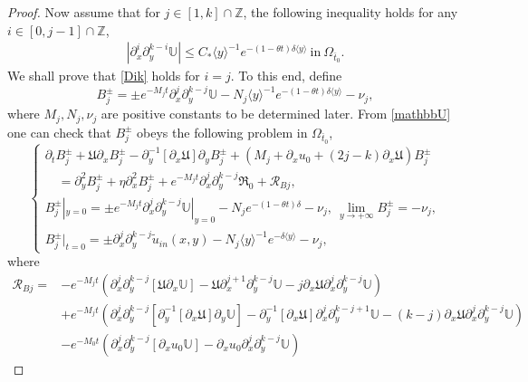 \documentclass{amsart}
\numberwithin{equation}{section}
\newcommand\y{{{\langle y \rangle}}}
\begin{document}
\begin{proof}
Now assume that for $j\in[1,k]\cap\mathbb{Z}$, the following inequality holds for any $i\in[0,j-1]\cap\mathbb{Z}$,
\begin{align}\label{Dik}
|\partial_{x}^{i}\partial_{y}^{k-i}\mathbb{U}|\leq C_{*}\y^{-1}e^{-(1-\theta t)\delta\y}~\text{in}~\Omega_{\bar{t}_{0}}.
\end{align}
We shall prove that \eqref{Dik} holds for $i=j$.
To this end, define
$$B_{j}^{\pm}=\pm e^{-M_{j}t}\partial_{x}^{j}\partial_{y}^{k-j}\mathbb{U}-N_{j}\y^{-1}e^{-(1-\theta t)\delta\y}-\nu_{j},$$
where $M_{j},N_{j},\nu_{j}$ are positive constants to be determined later.
From \eqref{mathbbU} one can check that $B_{j}^{\pm}$ obeys the following problem in $\Omega_{\bar{t}_{0}}$,
\begin{equation}\label{Bj}
\begin{cases}
\partial_{t}B_{j}^{\pm}
+\mathfrak{U}\partial_{x}B_{j}^{\pm}
-\partial_{y}^{-1}[\partial_{x}\mathfrak{U}]\partial_{y}B_{j}^{\pm}
+(M_{j}+\partial_{x}u_{0}+(2j-k)\partial_{x}\mathfrak{U})B_{j}^{\pm}\\
\quad=\partial_{y}^{2}B_{j}^{\pm}+\eta\partial_{x}^{2}B_{j}^{\pm}+e^{-M_{j}t}\partial_{x}^{j}\partial_{y}^{k-j}\mathfrak{R}_{0}+\mathcal{R}_{Bj},\\
B_{j}^{\pm}|_{y=0}=\pm e^{-M_{j}t}\partial_{x}^{j}\partial_{y}^{k-j}\mathbb{U}|_{y=0}-N_{j}e^{-(1-\theta t)\delta}-\nu_{j},
~\lim\limits_{y\to+\infty}B_{j}^{\pm}=-\nu_{j},\\
B_{j}^{\pm}|_{t=0}=\pm\partial_{x}^{j}\partial_{y}^{k-j}\tilde{u}_{in}(x,y)-N_{j}\y^{-1}e^{-\delta\y}-\nu_{j},
\end{cases}
\end{equation}
where
\begin{align*}
\mathcal{R}_{Bj}
=&-e^{-M_{j}t}\left(\partial_{x}^{j}\partial_{y}^{k-j}[\mathfrak{U}\partial_{x}\mathbb{U}]
                    -\mathfrak{U}\partial_{x}^{j+1}\partial_{y}^{k-j}\mathbb{U}
                    -j\partial_{x}\mathfrak{U}\partial_{x}^{j}\partial_{y}^{k-j}\mathbb{U}\right)\\
 &+e^{-M_{j}t}\left(\partial_{x}^{j}\partial_{y}^{k-j}[\partial_{y}^{-1}[\partial_{x}\mathfrak{U}]\partial_{y}\mathbb{U}]
                    -\partial_{y}^{-1}[\partial_{x}\mathfrak{U}]\partial_{x}^{j}\partial_{y}^{k-j+1}\mathbb{U}
                    -(k-j)\partial_{x}\mathfrak{U}\partial_{x}^{j}\partial_{y}^{k-j}\mathbb{U}\right)\\
 &-e^{-M_{0}t}\left(\partial_{x}^{j}\partial_{y}^{k-j}[\partial_{x}u_{0}\mathbb{U}]-\partial_{x}u_{0}\partial_{x}^{j}\partial_{y}^{k-j}\mathbb{U}\right)

\end{align*}
\end{proof}
\end{document}
